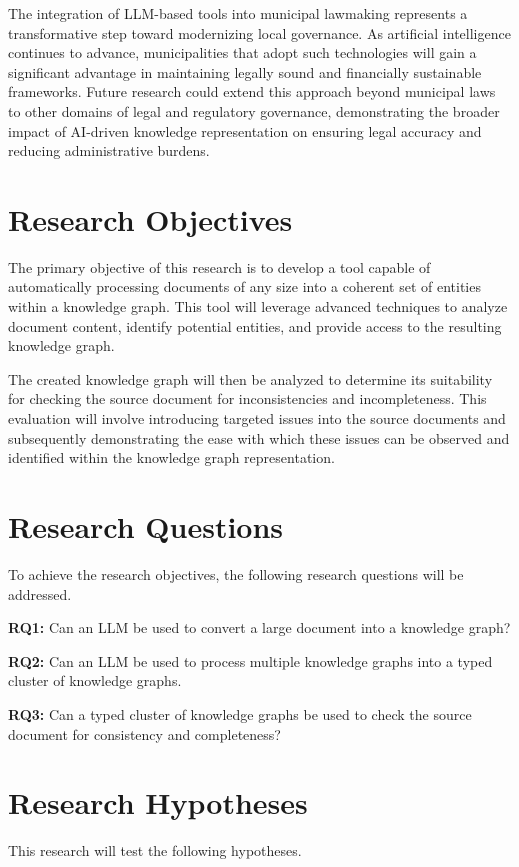 The integration of LLM-based tools into municipal lawmaking represents a transformative step toward modernizing local governance. As artificial intelligence continues to advance, municipalities that adopt such technologies will gain a significant advantage in maintaining legally sound and financially sustainable frameworks. Future research could extend this approach beyond municipal laws to other domains of legal and regulatory governance, demonstrating the broader impact of AI-driven knowledge representation on ensuring legal accuracy and reducing administrative burdens.

\section{Research Objectives}
The primary objective of this research is to develop a tool capable of automatically processing documents of any size into a coherent set of entities within a knowledge graph. This tool will leverage advanced techniques to analyze document content, identify potential entities, and provide access to the resulting knowledge graph.

The created knowledge graph will then be analyzed to determine its suitability for checking the source document for inconsistencies and incompleteness. This evaluation will involve introducing targeted issues into the source documents and subsequently demonstrating the ease with which these issues can be observed and identified within the knowledge graph representation.

\section{Research Questions}
To achieve the research objectives, the following research questions will be addressed.

\textbf{RQ1:} Can an LLM be used to convert a large document into a knowledge graph?\par

\textbf{RQ2:} Can an LLM be used to process multiple knowledge graphs into a typed cluster of knowledge graphs.\par

\textbf{RQ3:} Can a typed cluster of knowledge graphs be used to check the source document for consistency and completeness?\par
\section{Research Hypotheses}
This research will test the following hypotheses.

